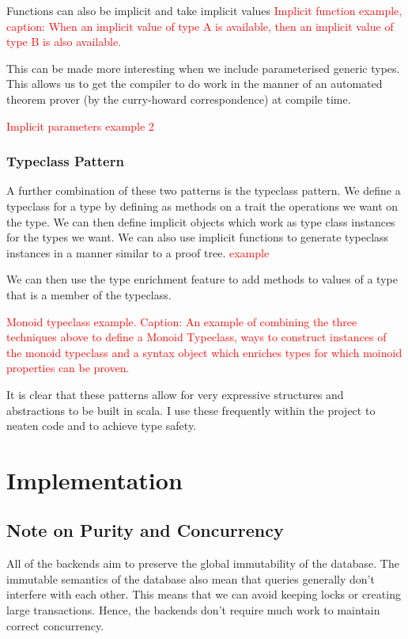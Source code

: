 \documentclass[12pt,a4paper,twoside,openright]{report}
\newcommand\todo[1]{\textcolor{red}{#1}}
\begin{document}
Functions can also be implicit and take implicit values
\todo{Implicit function example, caption: When an implicit value of type A is available, then an implicit value of type B is also available.}


This can be made more interesting when we include parameterised generic types. This allows us to get the compiler to do work in the manner of an automated theorem prover (by the curry-howard correspondence) at compile time.

\todo{Implicit parameters example 2}


\subsection{Typeclass Pattern}
A further combination of these two patterns is the typeclass pattern. We define a typeclass for a type by defining as methods on a trait the operations we want on the type. We can then define implicit objects which work as type class instances for the types we want. We can also use implicit functions to generate typeclass instances in a manner similar to a proof tree. \todo{example}

We can then use the type enrichment feature to add methods to values of a type that is a member of the typeclass.

\todo{Monoid typeclass example. Caption: An example of combining the three techniques above to define a Monoid Typeclass, ways to construct instances of the monoid typeclass and a syntax object which enriches types for which moinoid properties can be proven.}

It is clear that these patterns allow for very expressive structures and abstractions to be built in scala. I use these frequently within the project to neaten code and to achieve type safety.



\chapter{Implementation}
\section{Note on Purity and Concurrency}
All of the backends aim to preserve the global immutability of the database. The immutable semantics of the database also mean that queries generally don’t interfere with each other. This means that we can avoid keeping locks or creating large transactions. Hence, the backends don’t require much work to maintain correct concurrency.
\end{document}
